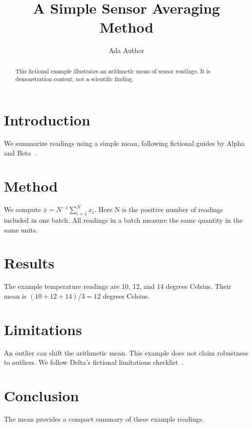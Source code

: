 \documentclass[journal]{IEEEtran}
\title{A Simple Sensor Averaging Method}
\author{Ada Author}
\begin{document}
\maketitle
\begin{abstract}
This fictional example illustrates an arithmetic mean of sensor readings.
It is demonstration content, not a scientific finding.
\end{abstract}
\section{Introduction}
We summarize readings using a simple mean, following fictional guides
by Alpha~\cite{guide} and Beta~\cite{method}.
\section{Method}\label{sec:method}
We compute $\bar{x}=N^{-1}\sum_{i=1}^{N}x_i$.
Here N is the positive number of readings included in one batch.
All readings in a batch measure the same quantity in the same units.
\section{Results}\label{sec:results}
The example temperature readings are 10, 12, and 14 degrees Celsius.
Their mean is $(10+12+14)/3=12$ degrees Celsius.
\section{Limitations}\label{sec:limitations}
An outlier can shift the arithmetic mean. This example does not claim
robustness to outliers. We follow Delta's fictional limitations checklist~\cite{limits}.
\section{Conclusion}
The mean provides a compact summary of these example readings.


\end{document}
